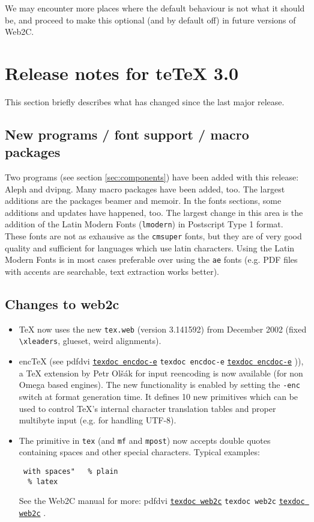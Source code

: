 \documentclass[11pt,a4paper]{article}
\newcommand{\pdfext}{pdf}
\newcommand{\dviext}{dvi}
\let\docext=\pdfext
\let\docext=\dviext
\newcommand{\dlink}[3]{%
  \ifpdf
    \ifx\pdfext#3
      \href{#1/#2.#3}{\texttt{texdoc #2}}%
    \else
      \texttt{texdoc #2}%
    \fi
  \else
     \href{#1/#2.#3}{\mbox{\texttt{texdoc #2}}}%
  \fi}
\begin{document}
We may encounter more places where the default behaviour is not what
it should be, and proceed to make this optional (and by default off)
in future versions of Web2C.


\section{Release notes for te\TeX{} 3.0}
This section briefly describes what has changed since the last major
release.

\subsection{New programs / font support / macro packages}
Two programs (see section \ref{sec:components}) have been added with
this release: Aleph and dvipng. Many macro packages have been added,
too.  The largest additions are the packages beamer and memoir. In the
fonts sections, some additions and updates have happened, too. The
largest change in this area is the addition of the Latin Modern Fonts
(\verb+lmodern+) in Postscript Type 1 format. These fonts are not as
exhausive as the \verb+cmsuper+ fonts, but they are of very good
quality and sufficient for languages which use latin characters. Using
the Latin Modern Fonts is in most cases preferable over using the
\verb+ae+ fonts (e.g. PDF files with accents are searchable, text
extraction works better).

\subsection{Changes to web2c}
\begin{itemize}
\item \TeX{} now uses the new \verb+tex.web+ (version 3.141592) from
  December 2002 (fixed \verb+\xleaders+, glueset, weird alignments).
\item enc\TeX{} (see
  \dlink{../../../texmf-dist/doc/generic/enctex}{encdoc-e}{\dviext})),
  a \TeX{} extension by Petr Ol\v s\'ak for input reencoding is now
  available (for non Omega based engines). The new functionality is
  enabled by setting the \verb+-enc+ switch at format generation time.
  It defines 10 new primitives which can be used to control \TeX{}'s
  internal character translation tables and proper multibyte input
  (e.g. for handling UTF-8).
\item The \verb++ primitive in \verb+tex+ (and \verb+mf+ and
  \verb+mpost+) now accepts double quotes containing spaces and other
  special characters.  Typical examples:
\begin{verbatim}
 with spaces"   % plain
  % latex
\end{verbatim}
See the Web2C manual for more: \dlink{../../../texmf-dist/doc/programs}{web2c}{\docext}.
\end{itemize}
\end{document}
